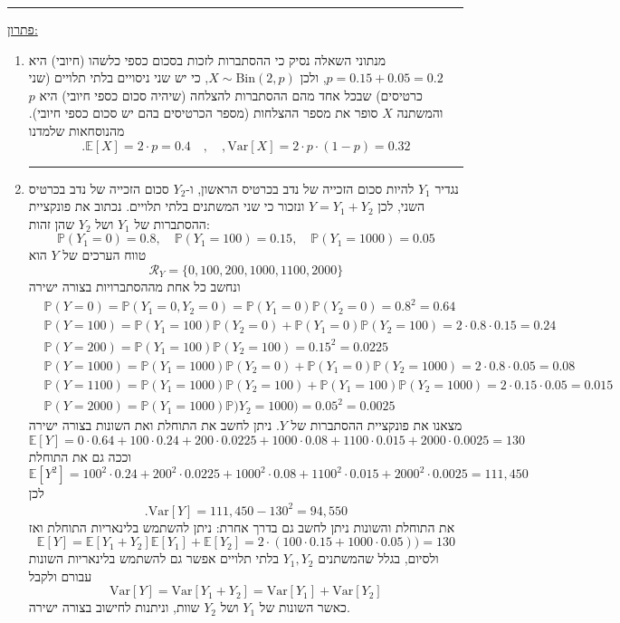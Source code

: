 \documentclass[12pt, a4paper]{article}
\newcommand{\cR}{\mathcal{R}}
\newcommand{\PP}{\mathbb{P}}
\newcommand{\Bin}{\mathrm{Bin}}
\newcommand{\Var}{\mathrm{Var}}
\newcommand{\EE}{\mathbb{E}}
\begin{document}
\begin{enumerate}
\noindent\rule{15cm}{0.4pt}

\underline{פתרון:}
\begin{enumerate}
\item
מנתוני השאלה נסיק כי ההסתברות לזכות בסכום כספי כלשהו (חיובי) היא
$p=0.15+0.05=0.2$,
ולכן
$X\sim\Bin(2,p)$,
כי יש שני ניסויים בלתי תלויים (שני כרטיסים) שבכל אחד מהם ההסתברות להצלחה (שיהיה סכום כספי חיובי) היא 
$p$
והמשתנה
$X$
סופר את מספר ההצלחות (מספר הכרטיסים בהם יש סכום כספי חיובי). מהנוסחאות שלמדנו
$$.\EE[X]=2\cdot p=0.4\quad,\quad,
\Var[X]=2\cdot p\cdot (1-p)=0.32$$

\noindent\rule{15cm}{0.4pt}

\item
נגדיר
$Y_1$
להיות סכום הזכייה של נדב בכרטיס הראשון,
ו-$Y_2$
סכום הזכייה של נדב בכרטיס השני,
לכן
$Y=Y_1+Y_2$
ונזכור כי שני המשתנים בלתי תלויים.
נכתוב את פונקציית ההסתברות של
$Y_1$
ושל
$Y_2$
שהן זהות:
$$\PP(Y_1=0)=0.8,\quad
\PP(Y_1=100)=0.15,\quad
\PP(Y_1=1000)=0.05$$
טווח הערכים של
$Y$
הוא
$$\cR_Y=
\{
0, 100, 200, 1000, 1100, 2000
\}$$
ונחשב כל אחת מההסתברויות בצורה ישירה
\begin{align*}
&\PP(Y=0)=
\PP(Y_1=0,Y_2=0)=\PP(Y_1=0)\PP(Y_2=0)
=0.8^2=0.64
\\&\PP(Y=100)=
\PP(Y_1=100)\PP(Y_2=0)+\PP(Y_1=0)\PP(Y_2=100)=2\cdot 0.8\cdot 0.15
=0.24
\\&\PP(Y=200)=\PP(Y_1=100)\PP(Y_2=100)=0.15^2=0.0225
\\&\PP(Y=1000)=
\PP(Y_1=1000)\PP(Y_2=0)+\PP(Y_1=0)\PP(Y_2=1000)=2\cdot 0.8\cdot 0.05
=0.08
\\&\PP(Y=1100)=\PP(Y_1=1000)\PP(Y_2=100)+\PP(Y_1=100)\PP(Y_2=1000)
=2\cdot 0.15\cdot 0.05=0.015
\\&\PP(Y=2000)=\PP(Y_1=1000)\PP)Y_2=1000)=0.05^2=0.0025
\end{align*}
מצאנו את פונקציית ההסתברות של
$Y$.
ניתן לחשב את התוחלת ואת השונות בצורה ישירה
$$\EE[Y]
=0\cdot 0.64
+100\cdot 0.24+
200\cdot
0.0225
+1000\cdot
0.08+
1100\cdot
0.015
+2000\cdot
0.0025
=130$$
וככה גם את התוחלת 
$$\EE[Y^2]
=100^2\cdot 0.24+
200^2\cdot
0.0225
+1000^2\cdot
0.08+
1100^2\cdot
0.015
+2000^2\cdot
0.0025=111,450$$
לכן
$$.\Var[Y]=111,450-130^2=94,550$$
את התוחלת והשונות ניתן לחשב גם בדרך אחרת:
ניתן להשתמש בלינאריות התוחלת ואז
$$\EE[Y]=\EE[Y_1+Y_2]
\EE[Y_1]+\EE[Y_2]=
2\cdot
(100\cdot 0.15+1000\cdot 0.05))=130$$
ולסיום, בגלל שהמשתנים
$Y_1,Y_2$
בלתי תלויים אפשר גם להשתמש בלינאריות השונות עבורם ולקבל
$$\Var[Y]
=
\Var[Y_1+Y_2]=\Var[Y_1]+\Var[Y_2]$$
כאשר השונות של
$Y_1$
ושל
$Y_2$
שוות, וניתנות לחישוב בצורה ישירה.


\end{enumerate}
\end{enumerate}
\end{document}
